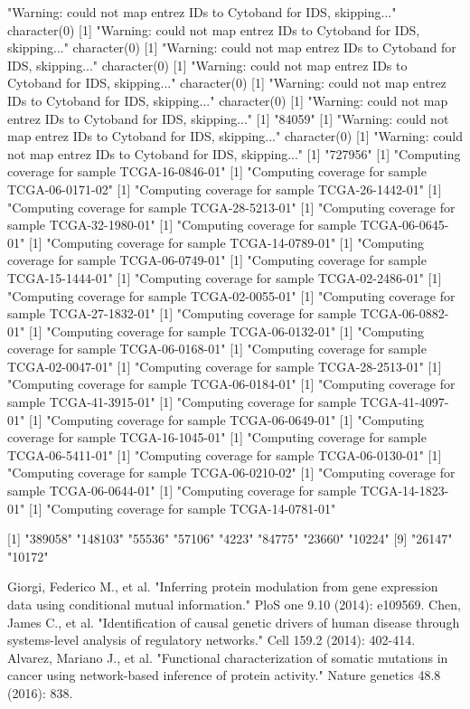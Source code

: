 \documentclass{article}
\begin{document}
\begin{Schunk}
[1] "Warning: could not map entrez IDs to Cytoband for IDS, skipping..."
character(0)
[1] "Warning: could not map entrez IDs to Cytoband for IDS, skipping..."
character(0)
[1] "Warning: could not map entrez IDs to Cytoband for IDS, skipping..."
character(0)
[1] "Warning: could not map entrez IDs to Cytoband for IDS, skipping..."
character(0)
[1] "Warning: could not map entrez IDs to Cytoband for IDS, skipping..."
character(0)
[1] "Warning: could not map entrez IDs to Cytoband for IDS, skipping..."
[1] "84059"
[1] "Warning: could not map entrez IDs to Cytoband for IDS, skipping..."
character(0)
[1] "Warning: could not map entrez IDs to Cytoband for IDS, skipping..."
[1] "727956"
[1] "Computing coverage for sample TCGA-16-0846-01"
[1] "Computing coverage for sample TCGA-06-0171-02"
[1] "Computing coverage for sample TCGA-26-1442-01"
[1] "Computing coverage for sample TCGA-28-5213-01"
[1] "Computing coverage for sample TCGA-32-1980-01"
[1] "Computing coverage for sample TCGA-06-0645-01"
[1] "Computing coverage for sample TCGA-14-0789-01"
[1] "Computing coverage for sample TCGA-06-0749-01"
[1] "Computing coverage for sample TCGA-15-1444-01"
[1] "Computing coverage for sample TCGA-02-2486-01"
[1] "Computing coverage for sample TCGA-02-0055-01"
[1] "Computing coverage for sample TCGA-27-1832-01"
[1] "Computing coverage for sample TCGA-06-0882-01"
[1] "Computing coverage for sample TCGA-06-0132-01"
[1] "Computing coverage for sample TCGA-06-0168-01"
[1] "Computing coverage for sample TCGA-02-0047-01"
[1] "Computing coverage for sample TCGA-28-2513-01"
[1] "Computing coverage for sample TCGA-06-0184-01"
[1] "Computing coverage for sample TCGA-41-3915-01"
[1] "Computing coverage for sample TCGA-41-4097-01"
[1] "Computing coverage for sample TCGA-06-0649-01"
[1] "Computing coverage for sample TCGA-16-1045-01"
[1] "Computing coverage for sample TCGA-06-5411-01"
[1] "Computing coverage for sample TCGA-06-0130-01"
[1] "Computing coverage for sample TCGA-06-0210-02"
[1] "Computing coverage for sample TCGA-06-0644-01"
[1] "Computing coverage for sample TCGA-14-1823-01"
[1] "Computing coverage for sample TCGA-14-0781-01"
 [1] "389058" "148103" "55536"  "57106"  "4223"   "84775"  "23660"  "10224" 
 [9] "26147"  "10172" \end{Schunk}


\begin{thebibliography}{99}

Giorgi, Federico M., et al. "Inferring protein modulation from gene expression data using conditional mutual information." PloS one 9.10 (2014): e109569.
 Chen, James C., et al. "Identification of causal genetic drivers of human disease through systems-level analysis of regulatory networks." Cell 159.2 (2014): 402-414.
Alvarez, Mariano J., et al. "Functional characterization of somatic mutations in cancer using network-based inference of protein activity." Nature genetics 48.8 (2016): 838.
\end{thebibliography}
\end{document}
